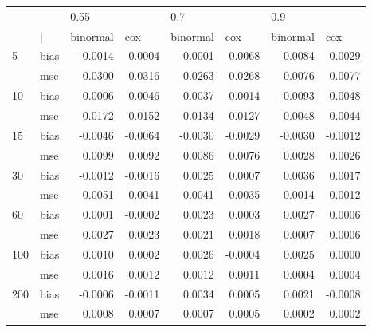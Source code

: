 \begin{table}[ht]
\centering
\begin{tabular}{ll rrrrrr}
  \toprule
     &            & \multicolumn{1}{l}{     0.55} & \multicolumn{1}{l}{        } & \multicolumn{1}{l}{      0.7} & \multicolumn{1}{l}{        } & \multicolumn{1}{l}{      0.9} & \multicolumn{1}{l}{        } \\ 
      &  $\vert$  & \multicolumn{1}{l}{ binormal} & \multicolumn{1}{l}{     cox} & \multicolumn{1}{l}{ binormal} & \multicolumn{1}{l}{     cox} & \multicolumn{1}{l}{ binormal} & \multicolumn{1}{l}{     cox} \\ 
   \midrule
5   & bias       &  -0.0014 &  0.0004 &  -0.0001 &  0.0068 &  -0.0084 &  0.0029 \\ 
      & mse        &   0.0300 &  0.0316 &   0.0263 &  0.0268 &   0.0076 &  0.0077 \\ 
  10  & bias       &   0.0006 &  0.0046 &  -0.0037 & -0.0014 &  -0.0093 & -0.0048 \\ 
      & mse        &   0.0172 &  0.0152 &   0.0134 &  0.0127 &   0.0048 &  0.0044 \\ 
  15  & bias       &  -0.0046 & -0.0064 &  -0.0030 & -0.0029 &  -0.0030 & -0.0012 \\ 
      & mse        &   0.0099 &  0.0092 &   0.0086 &  0.0076 &   0.0028 &  0.0026 \\ 
  30  & bias       &  -0.0012 & -0.0016 &   0.0025 &  0.0007 &   0.0036 &  0.0017 \\ 
      & mse        &   0.0051 &  0.0041 &   0.0041 &  0.0035 &   0.0014 &  0.0012 \\ 
  60  & bias       &   0.0001 & -0.0002 &   0.0023 &  0.0003 &   0.0027 &  0.0006 \\ 
      & mse        &   0.0027 &  0.0023 &   0.0021 &  0.0018 &   0.0007 &  0.0006 \\ 
  100 & bias       &   0.0010 &  0.0002 &   0.0026 & -0.0004 &   0.0025 &  0.0000 \\ 
      & mse        &   0.0016 &  0.0012 &   0.0012 &  0.0011 &   0.0004 &  0.0004 \\ 
  200 & bias       &  -0.0006 & -0.0011 &   0.0034 &  0.0005 &   0.0021 & -0.0008 \\ 
      & mse        &   0.0008 &  0.0007 &   0.0007 &  0.0005 &   0.0002 &  0.0002 \\ 
   \bottomrule
\end{tabular}
\end{table}
